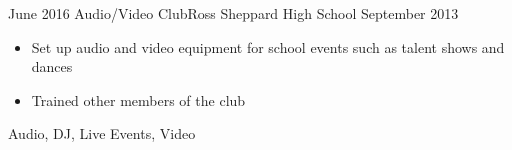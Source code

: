 
\begin{experiences}
  \experience
    {June 2016}   {Audio/Video Club}{Ross Sheppard High School}{}
    {September 2013} {
                      \begin{itemize}
                        \item Set up audio and video equipment for school events such as talent shows and dances
                        \item Trained other members of the club
                      \end{itemize}
                    }
                    {
                        Audio,
                        DJ,
                        Live Events,
                        Video
                    }

\end{experiences}